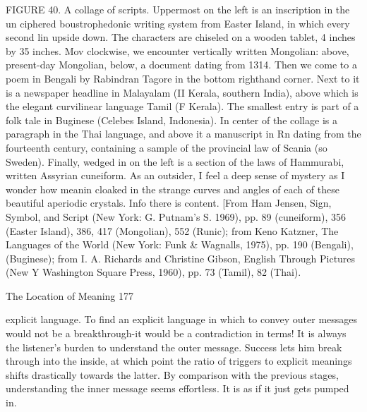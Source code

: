 FIGURE 40. A collage of scripts. Uppermost on the left is an inscription in the un ciphered
boustrophedonic writing system from Easter Island, in which every second lin upside down. The
characters are chiseled on a wooden tablet, 4 inches by 35 inches. Mov clockwise, we encounter
vertically written Mongolian: above, present-day Mongolian, below, a document dating from
1314. Then we come to a poem in Bengali by Rabindran Tagore in the bottom righthand corner.
Next to it is a newspaper headline in Malayalam (II Kerala, southern India), above which is the
elegant curvilinear language Tamil (F Kerala). The smallest entry is part of a folk tale in
Buginese (Celebes Island, Indonesia). In center of the collage is a paragraph in the Thai
language, and above it a manuscript in Rn dating from the fourteenth century, containing a
sample of the provincial law of Scania (so Sweden). Finally, wedged in on the left is a section of
the laws of Hammurabi, written Assyrian cuneiform. As an outsider, I feel a deep sense of
mystery as I wonder how meanin cloaked in the strange curves and angles of each of these
beautiful aperiodic crystals. Info there is content. [From Ham Jensen, Sign, Symbol, and Script
(New York: G. Putnam's S. 1969), pp. 89 (cuneiform), 356 (Easter Island), 386, 417 (Mongolian),
552 (Runic); from Keno Katzner, The Languages of the World (New York: Funk \& Wagnalls,
1975), pp. 190 (Bengali),
         (Buginese); from I. A. Richards and Christine Gibson, English Through Pictures (New Y
Washington Square Press, 1960), pp. 73 (Tamil), 82 (Thai).




The Location of Meaning                                                                      177

explicit language. To find an explicit language in which to convey outer messages would
not be a breakthrough-it would be a contradiction in terms! It is always the listener's
burden to understand the outer message. Success lets him break through into the inside, at
which point the ratio of triggers to explicit meanings shifts drastically towards the latter.
By comparison with the previous stages, understanding the inner message seems
effortless. It is as if it just gets pumped in.

